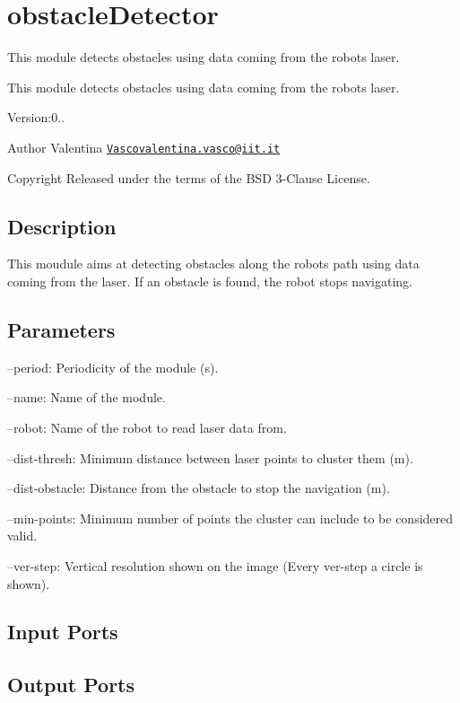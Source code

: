 \section{obstacle\+Detector}
\label{group__obstacleDetector}


This module detects obstacles using data coming from the robot\textquotesingle{}s laser.  


This module detects obstacles using data coming from the robot\textquotesingle{}s laser. 

Version\+:0.. \begin{DoxyAuthor}{Author}
Valentina \href{mailto:Vascovalentina.vasco@iit.it}{\tt Vascovalentina.\+vasco@iit.\+it} ~\newline
 
\end{DoxyAuthor}
\begin{DoxyCopyright}{Copyright}
Released under the terms of the B\+SD 3-\/\+Clause License. 
\end{DoxyCopyright}
\hypertarget{group__skeletonViewer_intro_sec}{}\subsection{Description}\label{group__skeletonViewer_intro_sec}
This moudule aims at detecting obstacles along the robot\textquotesingle{}s path using data coming from the laser. If an obstacle is found, the robot stops navigating.\hypertarget{group__skeletonViewer_parameters_sec}{}\subsection{Parameters}\label{group__skeletonViewer_parameters_sec}

\begin{DoxyItemize}
\item --period\+: Periodicity of the module (s).
\item --name\+: Name of the module.
\item --robot\+: Name of the robot to read laser data from.
\item --dist-\/thresh\+: Minimum distance between laser points to cluster them (m).
\item --dist-\/obstacle\+: Distance from the obstacle to stop the navigation (m).
\item --min-\/points\+: Minimum number of points the cluster can include to be considered valid.
\item --ver-\/step\+: Vertical resolution shown on the image (Every ver-\/step a circle is shown). 
\end{DoxyItemize}\hypertarget{group__skeletonViewer_inputports_sec}{}\subsection{Input Ports}\label{group__skeletonViewer_inputports_sec}
\hypertarget{group__skeletonViewer_outputports_sec}{}\subsection{Output Ports}\label{group__skeletonViewer_outputports_sec}

